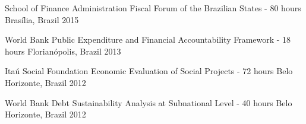 \begin{cventries}
 \cventry
    {School of Finance Administration}
    {Fiscal Forum of the Brazilian States - 80 hours}
    {Brasília, Brazil}
    {2015}
    {
      \begin{cvitems}
      \end{cvitems}
    } 
  \cventry
    {World Bank}
    {Public Expenditure and Financial Accountability Framework - 18 hours}
    {Florianópolis, Brazil}
    {2013}
    {
      \begin{cvitems}        
      \end{cvitems}
    }
  \cventry
    {Itaú Social Foundation}
    {Economic Evaluation of Social Projects - 72 hours}
    {Belo Horizonte, Brazil}
    {2012}
    {
      \begin{cvitems}        
      \end{cvitems}
    }
  \cventry
    {World Bank}
    {Debt Sustainability Analysis at Subnational Level - 40 hours}
    {Belo Horizonte, Brazil}
    {2012}
    {
      \begin{cvitems}        
      \end{cvitems}
    }        
\end{cventries}

